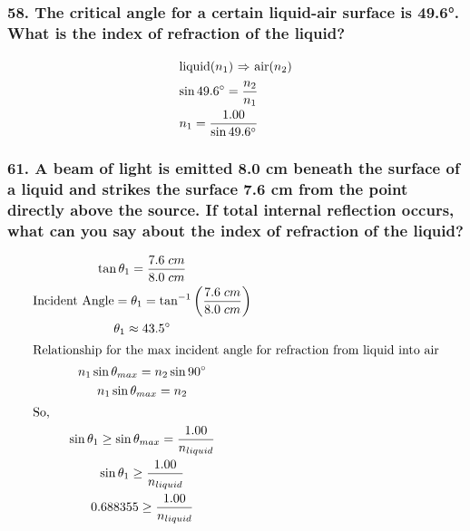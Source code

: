 \documentclass{article}
\newcommand{\bp}[1]{\left(#1\right)}
\begin{document}
\subsubsection*{
    58. The critical angle for a certain liquid-air surface is 49.6°. What is the
    index of refraction of the liquid?
}
\begin{gather*}
    \intertext{liquid($n_1$) $\Rightarrow$ air($n_2$)}
    \sin 49.6\degree = \displaystyle\frac{n_2}{n_1} \\
    n_1 = \displaystyle\frac{1.00}{\sin 49.6\degree} \\
\end{gather*}
\centerline{}
\subsubsection*{
    61. A beam of light is emitted 8.0 cm beneath the surface of a liquid and strikes
    the surface 7.6 cm from the point directly above the source. If total internal
    reflection occurs, what can you say about the index of refraction of the liquid?
}
\begin{gather*}
    \tan\theta_1 = \displaystyle\frac{7.6\;cm}{8.0\;cm} \\
    \text{Incident Angle} = \theta_1 = \tan^{-1}\bp{\displaystyle\frac{7.6\;cm}{8.0\;cm}} \\
    \theta_1 \approx 43.5\degree \\
    \intertext{Relationship for the max incident angle for refraction from
    liquid into air} 
    n_1\sin\theta_{max} = n_2\sin 90\degree \\
    n_1\sin\theta_{max} = n_2 \\
    \intertext{So,}
    \sin\theta_1 \geq \sin\theta_{max} = \displaystyle\frac{1.00}{n_{liquid}} \\
    \sin\theta_1 \geq \displaystyle\frac{1.00}{n_{liquid}} \\
    0.688355 \geq \displaystyle\frac{1.00}{n_{liquid}}
\end{gather*}
\centerline{}
\end{document}
